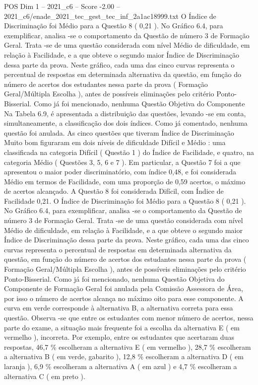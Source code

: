 \begin{textsample}{POS Dim 1 – 2021\_c6 – Score -2.00 – 2021\_c6/enade\_2021\_tec\_gest\_tec\_inf\_2a1ac18999.txt}
O Índice de Discriminação foi Médio para a Questão 8 ( 0,21 ).
No Gráfico 6.4, para exemplificar, analisa -se o comportamento da Questão de número 3 de Formação Geral.
Trata -se de uma questão considerada com nível Médio de dificuldade, em relação à Facilidade, e a que obteve o segundo maior Índice de Discriminação dessa parte da prova.
Neste gráfico, cada uma das cinco curvas representa o percentual de respostas em determinada alternativa da questão, em função do número de acertos dos estudantes nessa parte da prova ( Formação Geral/Múltipla Escolha ), antes de possíveis eliminações pelo critério Ponto-Bisserial.
Como já foi mencionado, nenhuma Questão Objetiva do Componente Na Tabela 6.9, é apresentada a distribuição das questões, levando -se em conta, simultaneamente, a classificação dos dois índices.
Como já comentado, nenhuma questão foi anulada.
As cinco questões que tiveram Índice de Discriminação Muito bom figuraram em dois níveis de dificuldade Difícil e Médio : uma classificada na categoria Difícil ( Questão 1 ) do Índice de Facilidade, e quatro, na categoria Médio ( Questões 3, 5, 6 e 7 ).
Em particular, a Questão 7 foi a que apresentou o maior poder discriminatório, com índice 0,48, e foi considerada Médio em termos de Facilidade, com uma proporção de 0,59 acertos, o máximo de acertos alcançado.
A Questão 8 foi considerada Difícil, com Índice de Facilidade 0,21.
O Índice de Discriminação foi Médio para a Questão 8 ( 0,21 ).
No Gráfico 6.4, para exemplificar, analisa -se o comportamento da Questão de número 3 de Formação Geral.
Trata -se de uma questão considerada com nível Médio de dificuldade, em relação à Facilidade, e a que obteve o segundo maior Índice de Discriminação dessa parte da prova.
Neste gráfico, cada uma das cinco curvas representa o percentual de respostas em determinada alternativa da questão, em função do número de acertos dos estudantes nessa parte da prova ( Formação Geral/Múltipla Escolha ), antes de possíveis eliminações pelo critério Ponto-Bisserial.
Como já foi mencionado, nenhuma Questão Objetiva do Componente de Formação Geral foi anulada pela Comissão Assessora de Área, por isso o número de acertos alcança no máximo oito para esse componente.
A curva em verde corresponde à alternativa B, a alternativa correta para essa questão.
Observa -se que entre os estudantes com menor número de acertos, nessa parte do exame, a situação mais frequente foi a escolha da alternativa E ( em vermelho ), incorreta.
Por exemplo, entre os estudantes que acertaram duas respostas, 46,7 \% escolheram a alternativa E ( em vermelho ), 28,7 \% escolheram a alternativa B ( em verde, gabarito ), 12,8 \% escolheram a alternativa D ( em laranja ), 6,9 \% escolheram a alternativa A ( em azul ) e 4,7 \% escolheram a alternativa C ( em preto ).

\end{textsample}

